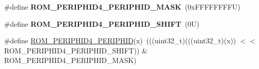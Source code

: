 \begin{DoxyCompactItemize}
\mbox{\label{group___m_t_b___register___masks_gad17e07925ea552218422be227581a58f}} 
\#define {\bfseries R\+O\+M\+\_\+\+P\+E\+R\+I\+P\+H\+I\+D4\+\_\+\+P\+E\+R\+I\+P\+H\+I\+D\+\_\+\+M\+A\+SK}~(0x\+F\+F\+F\+F\+F\+F\+F\+F\+U)
\item 
\mbox{\label{group___m_t_b___register___masks_ga4ea3b3a45be6eb8eb4372f565af2d5d9}} 
\#define {\bfseries R\+O\+M\+\_\+\+P\+E\+R\+I\+P\+H\+I\+D4\+\_\+\+P\+E\+R\+I\+P\+H\+I\+D\+\_\+\+S\+H\+I\+FT}~(0\+U)
\item 
\#define \mbox{\hyperlink{group___m_t_b___register___masks_gab4f815fbbdfce7ff4af7ddeca74eff41}{R\+O\+M\+\_\+\+P\+E\+R\+I\+P\+H\+I\+D4\+\_\+\+P\+E\+R\+I\+P\+H\+ID}}(x)~(((uint32\+\_\+t)(((uint32\+\_\+t)(x)) $<$$<$ R\+O\+M\+\_\+\+P\+E\+R\+I\+P\+H\+I\+D4\+\_\+\+P\+E\+R\+I\+P\+H\+I\+D\+\_\+\+S\+H\+I\+FT)) \& R\+O\+M\+\_\+\+P\+E\+R\+I\+P\+H\+I\+D4\+\_\+\+P\+E\+R\+I\+P\+H\+I\+D\+\_\+\+M\+A\+SK)
\end{DoxyCompactItemize}
